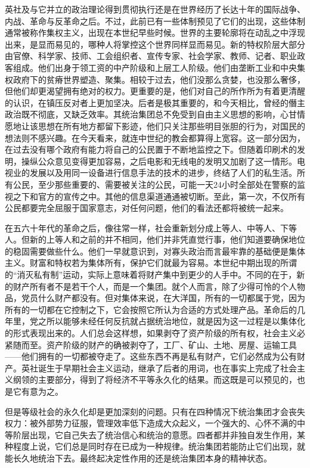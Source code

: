 英社及与它并立的政治理论得到贯彻执行还是在世界经历了长达十年的国际战争、内战、革命与反革命之后。不过，此前已有一些体制预见了它们的出现，这些体制通常被称作集权主义，出现在本世纪早些时候。世界的主要轮廓将在动乱之中浮现出来，是显而易见的，哪种人将掌控这个世界同样显而易见。新的特权阶层大部分由官僚、科学家、技师、工会组织者、宣传专家、社会学家、教师、记者、职业政客组成。他们出身于领工资的中产阶级和上层工人阶级。他们由垄断工业和中央集权政府下的贫瘠世界塑造、聚集。相较于过去，他们没那么贪婪，也没那么奢侈，但他们却更渴望拥有绝对的权力。更重要的是，他们对自己的所作所为有着更清醒的认识，在镇压反对者上更加坚决。后者是极其重要的，和今天相比，曾经的僭主政治既不彻底，又缺乏效率。其统治集团总不免受到自由主义思想的影响，心甘情愿地让该思想在所有地方都留下影迹，他们只关注那些明目张胆的行为，对国民的想法则不感兴趣。在今天看来，就连中世纪的教会都算得上宽容。这一部分因为，在过去没有哪个政府有能力将自己的公民置于不断地监控之下。但随着印刷术的发明，操纵公众意见变得更加容易，之后电影和无线电的发明又加剧了这一情形。电视业的发展以及用同一设备进行信息手法的技术的进步，终结了人们的私生活。所有公民，至少那些重要的、需要被关注的公民，可能一天24小时全部处在警察的监视之下和官方的宣传之中。其他的信息渠道通通被切断。至此，第一次，不仅所有公民都要完全屈服于国家意志，对任何问题，他们的看法还都将被统一起来。

在五六十年代的革命之后，像往常一样，社会重新划分成上等人、中等人、下等人。但新的上等人和之前的并不相同，他们并非凭直觉行事，他们知道要确保地位的稳固需要做些什么。他们一早就意识到，对寡头政治而言最牢靠的基础便是集体主义。财富和特权若为集体所有，保护它们就最为容易。本世纪中期出现的所谓的``消灭私有制''运动，实际上意味着将财产集中到更少的人手中。不同的在于，新的财产所有者不是若干个人，而是一个集团。就个人而言，除了少得可怜的个人物品，党员什么财产都没有。但对集体来说，在大洋国，所有的一切都属于党，因为所有的一切都在它控制之下，它会按照它所认为合适的方式处理产品。革命后的几年里，党之所以能够未经任何反抗就占据统治地位，就是因为这一过程是以集体化的形式表现出来的。人们总会这样想，如果剥夺了资产阶级的所有权，社会主义必紧随而至。资产阶级的财产的确被剥夺了，工厂、矿山、土地、房屋、运输工具------他们拥有的一切都被夺走了。这些东西不再是私有财产，它们必然成为公有财产。英社诞生于早期社会主义运动，继承了后者的用词，也在事实上完成了社会主义纲领的主要部分，得到了将经济不平等永久化的结果。而这既是可以预见的，也是它有意为之。

但是等级社会的永久化却是更加深刻的问题。只有在四种情况下统治集团才会丧失权力：被外部势力征服，管理效率低下造成大众起义，一个强大的、心怀不满的中等阶层出现，它自己失去了统治信心和统治的意愿。四者都并非独自发生作用，某种程度上说，它们总是同时存在已成为一种规律。统治集团若能防止它们出现，就能长久地统治下去。最终起决定性作用的还是统治集团本身的精神状态。

